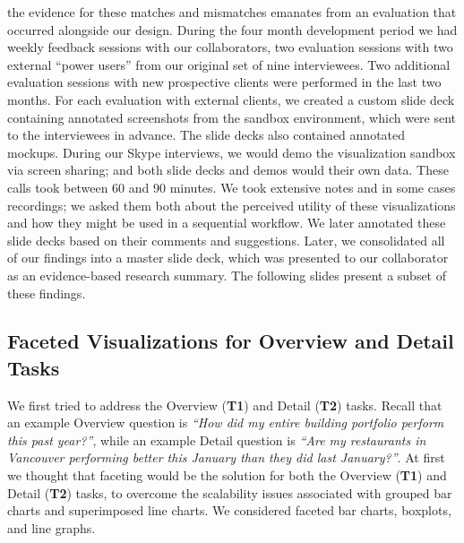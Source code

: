 \documentclass[journal]{vgtc}                %
\newcommand{\bstart}[1]{\vspace{1mm} \noindent{\textbf{#1:}}}
\begin{document}
\bstart{Evaluation} the evidence for these matches and mismatches emanates from an evaluation that occurred alongside our design. 
During the four month development period we had weekly feedback sessions with our collaborators, two evaluation sessions with two external ``power users'' from our original set of nine interviewees. 
Two additional evaluation sessions with new prospective clients were performed in the last two months.
For each evaluation with external clients, we created a custom slide deck containing annotated screenshots from the sandbox environment, which were sent to the interviewees in advance. 
The slide decks also contained annotated mockups. 
During our Skype interviews, we would demo the visualization sandbox via screen sharing; and both slide decks and demos would their own data. 
These calls took between 60 and 90 minutes. 
We took extensive notes and in some cases recordings; we asked them both about the perceived utility of these visualizations and how they might be used in a sequential workflow. 
We later annotated these slide decks based on their comments and suggestions.
Later, we consolidated all of our findings into a master slide deck, which was presented to our collaborator as an evidence-based research summary. 
The following slides present a subset of these findings.


\subsection{Faceted Visualizations for Overview and Detail Tasks}
\label{design-faceting}



We first tried to address the Overview ({\bf T1}) and Detail ({\bf T2}) tasks. 
Recall that an example Overview question is {\it ``How did my entire building portfolio perform this past year?''}, while an example Detail question is {\it ``Are my restaurants in Vancouver performing better this January than they did last January?''}.
At first we thought that faceting would be the solution for both the Overview ({\bf T1}) and Detail ({\bf T2}) tasks, to overcome the scalability issues associated with grouped bar charts and superimposed line charts.
We considered faceted bar charts, boxplots, and line graphs.
\end{document}
